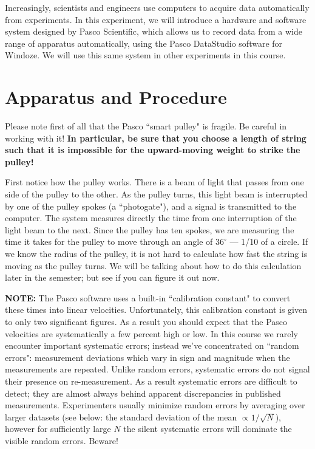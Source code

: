 Increasingly, scientists and engineers use computers to acquire data
automatically from experiments.  In this experiment, we will introduce
a hardware and software system designed by Pasco Scientific, which
allows us to 
record data from a wide
range of apparatus automatically, using the Pasco DataStudio
software for Windoze.  We will use this same system in
other experiments in this course.



\section*{Apparatus and Procedure}

Please note first of all that the Pasco ``smart pulley" is fragile.
Be careful in working with it!  {\bf In particular, be sure that you
choose
a length of string such that it is impossible for the upward-moving
weight to strike the pulley!}

First notice how the pulley works.  There is a beam of light that
passes from one side of the pulley to the other.  As the pulley turns,
this light beam is interrupted by one of the pulley spokes (a ``photogate"), and a
signal is transmitted to the computer.  The system measures
directly the time from one interruption of the light beam to the next.
Since the pulley has ten spokes, we are measuring the time it takes
for the pulley to move through an angle of $36^{\circ}$ --- 1/10 of a
circle. If
we know the radius of the pulley, it is not hard to calculate how fast
the string is moving as the pulley turns.
We will be talking about how to do this calculation later in the
semester; but see if you can figure it out now.

{\bf NOTE:} The Pasco software uses a built-in ``calibration constant"
to convert these times into linear velocities.  Unfortunately, this
calibration constant is given to only two significant figures.  As a
result you should expect that the Pasco velocities are systematically
a few percent high or low.  In this course we rarely encounter important
systematic errors; instead we've concentrated on ``random errors": measurement
deviations which vary in  sign and magnitude when the measurements are repeated.
Unlike random errors, systematic errors do not signal their presence
on re-measurement.  As a result systematic errors are difficult to detect;
they are almost always behind apparent discrepancies in published measurements.
Experimenters usually minimize random errors by averaging over  larger datasets
(see below: the standard deviation of the mean $\propto 1/\sqrt{N}$), however
for sufficiently large $N$ the silent systematic errors will dominate the
visible random errors.  Beware!


